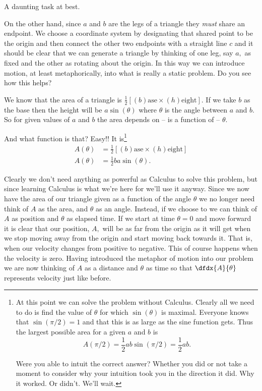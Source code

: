 A daunting task at best.

On the other hand, since $a$ and $b$ are the legs of a triangle they
\emph{must} share an endpoint. We choose a coordinate system by
designating that shared point to be the origin and then connect the
other two endpoints with a straight line $c$ and it should be clear
that we can generate a triangle by thinking of one leg, say $a,$ as
fixed and the other as rotating about the origin.  In this way we can
introduce motion, at least metaphorically, into what is really a
static problem. Do you see how this helps?

We know that the area of a triangle is
$\frac12\left[\text{$(b)$ase}\times\text{$(h)$eight}\right].$ If we
take $b$ as the base then the height will be $a\sin(\theta)$ where
$\theta$ is the angle between $a$ and $b.$ So for given values of $a$
and $b$ the area depends on -- is a function of -- $\theta.$

And what function is that? Easy!! It is\footnote{
  At this point we can solve the problem without Calculus. Clearly all
  we need to do is find the value of $\theta $ for which $\sin(\theta)$
  is maximal. Everyone knows that $\sin(\pi/2)=1$ and that this is as
  large as the sine function gets. Thus the largest possible area for a
  given $a$ and $b$ is
  $$
  A(\pi/2) = \frac12ab\sin(\pi/2) = \frac12ab.
  $$

  Were you able to intuit the correct answer? Whether you did or not
  take a moment to consider why your intuition took you in the direction
  it did. Why it worked. Or didn't. We'll wait.
}
\begin{align*}
  A(\theta) &=
              \frac12\left[\text{$(b)$ase}\times\text{$(h)$eight}\right]  \\
  A(\theta) &= \frac12ba\sin(\theta).
\end{align*}


Clearly we don't need anything as powerful as Calculus to solve this
problem, but since learning Calculus is what we're here for we'll use
it anyway. Since we now have the area of our triangle given as a
function of the angle $\theta$ we no longer need think of $A$ as the
area, and $\theta$ as an angle. Instead, if we choose to we can think
of $A$ as position and $\theta$ as elapsed time. If we start at time
$\theta=0$ and move forward it is clear that our position, $A,$ will
be as far from the origin as it will get when we stop moving away from
the origin and start moving back towards it. That is, when our
velocity changes from positive to negative. This of course happens
when the velocity is zero. Having introduced the metaphor of motion
into our problem we are now thinking of $A$ as a distance and $\theta$
as time so that $\dfdx{A}{\theta}$ represents velocity just like
before.

